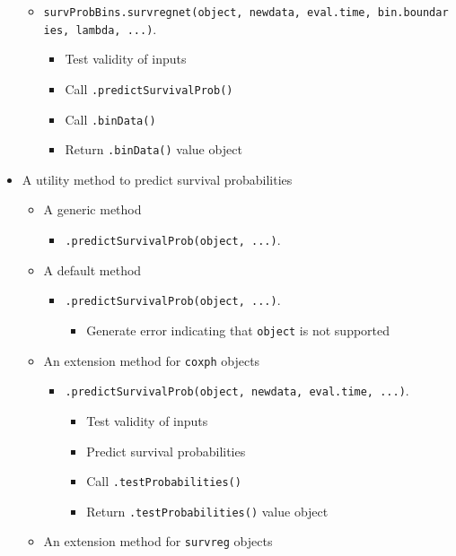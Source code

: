 \documentclass[
]{book}
\providecommand{\tightlist}{%
  \setlength{\itemsep}{0pt}\setlength{\parskip}{0pt}}
\begin{document}
\begin{itemize}
  \begin{itemize}
  \tightlist
  \item
    \texttt{survProbBins.survregnet(object,\ newdata,\ eval.time,\ bin.boundaries,\ lambda,\ ...)}.

    \begin{itemize}
    \tightlist
    \item
      Test validity of inputs
    \item
      Call \texttt{.predictSurvivalProb()}
    \item
      Call \texttt{.binData()}
    \item
      Return \texttt{.binData()} value object
    \end{itemize}
  \end{itemize}
\item
  A utility method to predict survival probabilities

  \begin{itemize}
  \tightlist
  \item
    A generic method

    \begin{itemize}
    \tightlist
    \item
      \texttt{.predictSurvivalProb(object,\ ...)}.
    \end{itemize}
  \item
    A default method

    \begin{itemize}
    \tightlist
    \item
      \texttt{.predictSurvivalProb(object,\ ...)}.

      \begin{itemize}
      \tightlist
      \item
        Generate error indicating that \texttt{object} is not supported
      \end{itemize}
    \end{itemize}
  \item
    An extension method for \texttt{coxph} objects

    \begin{itemize}
    \tightlist
    \item
      \texttt{.predictSurvivalProb(object,\ newdata,\ eval.time,\ ...)}.

      \begin{itemize}
      \tightlist
      \item
        Test validity of inputs
      \item
        Predict survival probabilities
      \item
        Call \texttt{.testProbabilities()}
      \item
        Return \texttt{.testProbabilities()} value object
      \end{itemize}
    \end{itemize}
  \item
    An extension method for \texttt{survreg} objects


\end{itemize}
\end{itemize}
\end{document}
